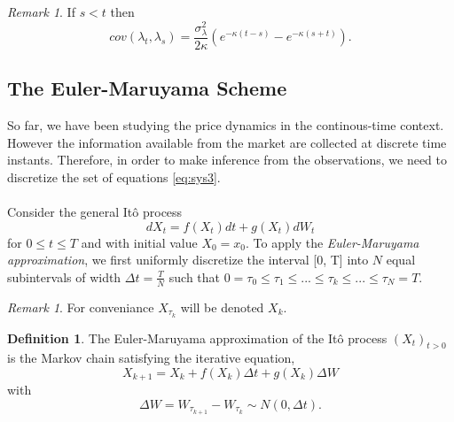 \documentclass{article}
\theoremstyle{definition}
\newtheorem{definition}[thm]{Definition}
\theoremstyle{remark}
\newtheorem{remark}[thm]{Remark}
\newcommand{\Ito}{It\^{o} }
\newcommand{\process}[1]{\ensuremath{(#1_t)_{t>0}}}
\begin{document}
\begin{remark}
If $s<t$ then
\begin{equation*}
cov(\lambda_t, \lambda_s)=\frac{\sigma_\lambda^2}{2\kappa} (e^{-\kappa(t-s)}-e^{-\kappa(s+t)}).
\end{equation*}
\end{remark}








\subsection{The Euler-Maruyama Scheme}\label{sec:EM}
So far, we have been studying the price dynamics in the continous-time context. However the information available from the market are collected at discrete time instants. Therefore, in order to make inference from the observations, we need to discretize the set of equations \eqref{eq:sys3}.\\
\\
Consider the general \Ito process 
\begin{equation}
dX_t=f(X_t)dt+g(X_t)dW_t
\end{equation}
for $0\leq t \leq T$ and with initial value $X_{0}=x_0$.
To apply the \emph{Euler-Maruyama approximation}, we first uniformly discretize the interval [0, T] into $N$ equal subintervals of width $\Delta t=\frac{T}{N}$ such that $0=\tau_0 \leq \tau_1 \leq ... \leq \tau_k \leq ... \leq \tau_N=T$. 
\begin{remark}
For conveniance  $X_{\tau_k}$ will be denoted $X_k$. 
\end{remark}

\begin{definition}
The Euler-Maruyama approximation of the \Ito process \process{X} is the Markov chain satisfying the iterative equation,
$$X_{k+1}=X_k+f(X_k)\Delta t+g(X_k)\Delta W$$
with
\begin{equation}\label{eq:deltaW}
\Delta W =W_{\tau_{k+1}}-W_{\tau_k} \sim N(0,\Delta t).
\end{equation}
\end{definition}
\end{document}
